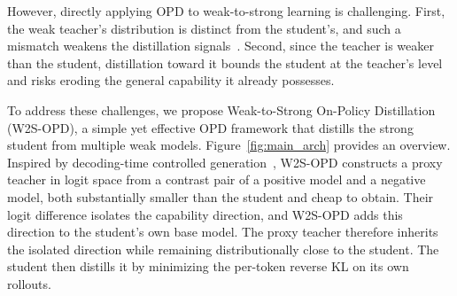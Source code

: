 \documentclass{article}
\newcommand\ours{W2S-OPD\xspace}
\begin{document}
However, directly applying OPD to weak-to-strong learning is challenging. First, the weak teacher's distribution is distinct from the student's, and such a mismatch weakens the distillation signals~\citep{ko2026scaling, li2026rethinking}. Second, since the teacher is weaker than the student, distillation toward it bounds the student at the teacher's level and risks eroding the general capability it already possesses.

To address these challenges, we propose Weak-to-Strong On-Policy Distillation (\ours), a simple yet effective OPD framework that distills the strong student from multiple weak models. Figure~\ref{fig:main_arch} provides an overview. 
Inspired by decoding-time controlled generation~\citep{liu2021dexperts, liu2024tuning}, 
\ours constructs a proxy teacher in logit space from a contrast pair of a positive model and a negative model, both substantially smaller than the student and cheap to obtain. Their logit difference isolates the capability direction, and \ours adds this direction to the student's own base model. The proxy teacher therefore inherits the isolated direction while remaining distributionally close to the student. The student then distills it by minimizing the per-token reverse KL on its own rollouts.
\end{document}
